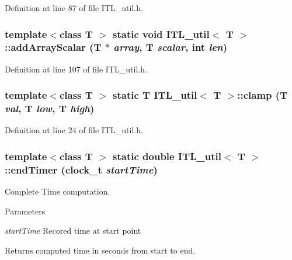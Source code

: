 Definition at line 87 of file ITL\_\-util.h.

\hypertarget{classITL__util_ab67646a3fb9b2749d2f763125ccb1dfa}{
\subsubsection[{addArrayScalar}]{\setlength{\rightskip}{0pt plus 5cm}template$<$class T $>$ static void {\bf ITL\_\-util}$<$ T $>$::addArrayScalar (T $\ast$ {\em array}, \/  T {\em scalar}, \/  int {\em len})}}
\label{classITL__util_ab67646a3fb9b2749d2f763125ccb1dfa}


Definition at line 107 of file ITL\_\-util.h.

\hypertarget{classITL__util_a7d3b943bbe22704d2ac9d62fd8820b90}{
\subsubsection[{clamp}]{\setlength{\rightskip}{0pt plus 5cm}template$<$class T $>$ static T {\bf ITL\_\-util}$<$ T $>$::clamp (T {\em val}, \/  T {\em low}, \/  T {\em high})}}
\label{classITL__util_a7d3b943bbe22704d2ac9d62fd8820b90}


Definition at line 24 of file ITL\_\-util.h.

\hypertarget{classITL__util_aedbe31ffc820a9a99f4fbcea35f184ca}{
\subsubsection[{endTimer}]{\setlength{\rightskip}{0pt plus 5cm}template$<$class T $>$ static double {\bf ITL\_\-util}$<$ T $>$::endTimer (clock\_\-t {\em startTime})}}
\label{classITL__util_aedbe31ffc820a9a99f4fbcea35f184ca}


Complete Time computation. 


\begin{DoxyParams}{Parameters}
\item[{\em startTime}]Recored time at start point \end{DoxyParams}
\begin{DoxyReturn}{Returns}
computed time in seconds from start to end. 
\end{DoxyReturn}



